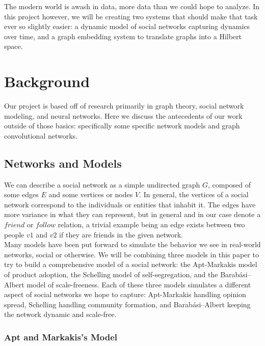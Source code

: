 \documentclass[12pt,twoside]{report}
\begin{document}
The modern world is awash in data, more data than we could hope to analyze. In this project however, we will be creating two systems that should make that task ever so slightly easier: a dynamic model of social networks capturing dynamics over time, and a graph embedding system to translate graphs into a Hilbert space. \\

\chapter{Background}

Our project is based off of research primarily in graph theory, social network modeling, and neural networks. Here we discuss the antecedents of our work outside of those basics: specifically some specific network models and graph convolutional networks. \\

\section{Networks and Models} 

We can describe a social network as a simple undirected graph $G$, composed of some edges $E$ and some vertices or nodes $V$. In general, the vertices of a social network correspond to the individuals or entities that inhabit it. The edges have more variance in what they can represent, but in general and in our case denote a 
$friend$ or $follow$ relation, a trivial example being an edge exists between two people $v1$ and $v2$ if they are friends in the given network. \\

Many models have been put forward to simulate the behavior we see in real-world networks, social or otherwise. We will be combining three models in this paper to try to build a comprehensive model of a social network: the Apt-Markakis model of product adoption, the Schelling model of self-segregation, and the Barabási–Albert model of scale-freeness. Each of these three models simulates a different aspect of social networks we hope to capture: Apt-Markakis handling opinion spread, Schelling handling community formation, and Barabási–Albert keeping the network dynamic and scale-free. \\

\subsection{Apt and Markakis's Model}
\end{document}
